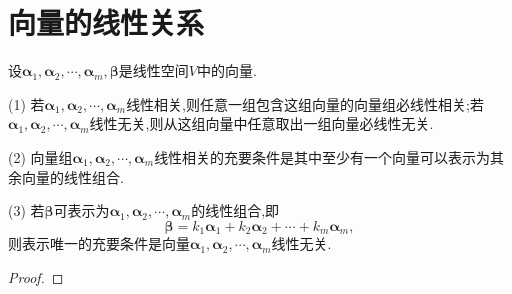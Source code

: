 \documentclass[../../main.tex]{subfiles}%
\begin{document}
\section{向量的线性关系}

\begin{theorem}\label{theorem:向量的线性关系定理1}
设\(\boldsymbol{\alpha}_1,\boldsymbol{\alpha}_2,\cdots,\boldsymbol{\alpha}_m,\boldsymbol{\beta}\)是线性空间\(V\)中的向量.

(1) 若\(\boldsymbol{\alpha}_1,\boldsymbol{\alpha}_2,\cdots,\boldsymbol{\alpha}_m\)线性相关,则任意一组包含这组向量的向量组必线性相关;若\(\boldsymbol{\alpha}_1,\boldsymbol{\alpha}_2,\cdots,\boldsymbol{\alpha}_m\)线性无关,则从这组向量中任意取出一组向量必线性无关.

(2) 向量组\(\boldsymbol{\alpha}_1,\boldsymbol{\alpha}_2,\cdots,\boldsymbol{\alpha}_m\)线性相关的充要条件是其中至少有一个向量可以表示为其余向量的线性组合.

(3) 若\(\boldsymbol{\beta}\)可表示为\(\boldsymbol{\alpha}_1,\boldsymbol{\alpha}_2,\cdots,\boldsymbol{\alpha}_m\)的线性组合,即
\[
\boldsymbol{\beta}=k_1\boldsymbol{\alpha}_1 + k_2\boldsymbol{\alpha}_2+\cdots + k_m\boldsymbol{\alpha}_m,
\]
则表示唯一的充要条件是向量\(\boldsymbol{\alpha}_1,\boldsymbol{\alpha}_2,\cdots,\boldsymbol{\alpha}_m\)线性无关.
\end{theorem}
\begin{proof}



\end{proof}
\end{document}
